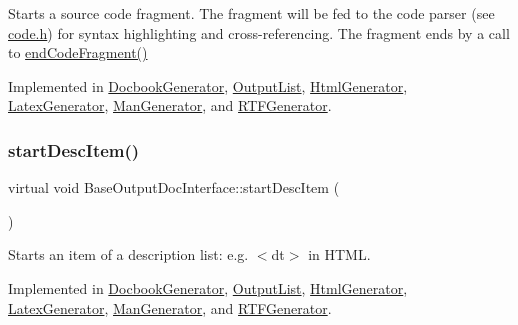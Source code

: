 Starts a source code fragment. The fragment will be fed to the code parser (see \mbox{\hyperlink{code_8h_source}{code.\+h}}) for syntax highlighting and cross-\/referencing. The fragment ends by a call to \mbox{\hyperlink{class_base_output_doc_interface_a08f032482a8f23ac1aab66552db43a81}{end\+Code\+Fragment()}} 

Implemented in \mbox{\hyperlink{class_docbook_generator_a698cf0a67c7e73af0c76cb0cf54e1530}{Docbook\+Generator}}, \mbox{\hyperlink{class_output_list_ae9d700d50e148d13422052cd58243624}{Output\+List}}, \mbox{\hyperlink{class_html_generator_ac071e1f57eb6e4b2d4baeae1723186bd}{Html\+Generator}}, \mbox{\hyperlink{class_latex_generator_a4fc23629424d5f2bb82f87d2d0311361}{Latex\+Generator}}, \mbox{\hyperlink{class_man_generator_a23377579a34bc5cee9a43885888dd5d4}{Man\+Generator}}, and \mbox{\hyperlink{class_r_t_f_generator_ac7783a014fb21a8688b4f334aea2cc30}{R\+T\+F\+Generator}}.

\mbox{\label{class_base_output_doc_interface_a5d1cc59d94c3f529c90e0a06704be181}} 
\subsubsection{\texorpdfstring{startDescItem()}{startDescItem()}}
{\footnotesize\ttfamily virtual void Base\+Output\+Doc\+Interface\+::start\+Desc\+Item (\begin{DoxyParamCaption}{ }\end{DoxyParamCaption})\hspace{0.3cm}{\ttfamily [pure virtual]}}

Starts an item of a description list\+: e.\+g. {\ttfamily $<$dt$>$} in H\+T\+ML. 

Implemented in \mbox{\hyperlink{class_docbook_generator_a20e9be1323c9378066b4302ec37fa67f}{Docbook\+Generator}}, \mbox{\hyperlink{class_output_list_a021752b31f2577c15d6cef3e858c84d8}{Output\+List}}, \mbox{\hyperlink{class_html_generator_a7a4d4ef015bc9d8298a6c023f85737c5}{Html\+Generator}}, \mbox{\hyperlink{class_latex_generator_a92603047f2bff0fef3c2bd5ed1be73d9}{Latex\+Generator}}, \mbox{\hyperlink{class_man_generator_a3230aa59d50e8bdbbfb94e56bd956f56}{Man\+Generator}}, and \mbox{\hyperlink{class_r_t_f_generator_a39ef721382a2a25ef0a41463a34f1b02}{R\+T\+F\+Generator}}.

